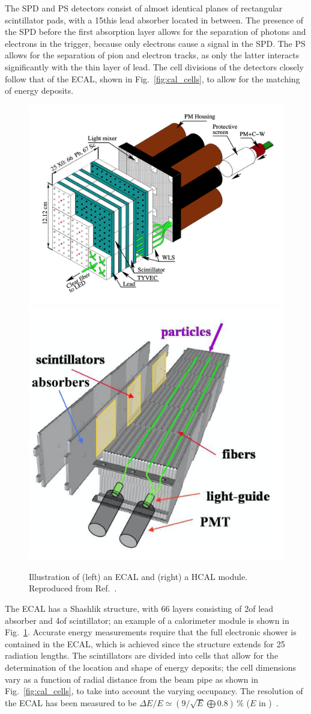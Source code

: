 The SPD and PS detectors consist of almost identical planes of rectangular scintillator pads, with a 15\mm this lead absorber located in between. The presence of the SPD before the first absorption layer allows for the separation of photons and electrons in the trigger, because only electrons cause a signal in the SPD. The PS allows for the separation of pion and electron tracks, as only the latter interacts significantly with the thin layer of lead. The cell divisions of the detectors closely follow that of the ECAL, shown in Fig.~\ref{fig:cal_cells}, to allow for the matching of energy deposits.

\begin{figure}[tb]
    \centering
    \includegraphics[width=0.55\columnwidth]{figures/detector/ECAL_module.png}
    \includegraphics[width=0.40\columnwidth]{figures/detector/HCAL_module.png}
    \caption{Illustration of (left) an ECAL and (right) a HCAL module. Reproduced from Ref.~\cite{ECALpaper,LHCb-Performance}.}
    \label{fig:ECAL_HCAL_modules}
\end{figure}

The ECAL has a Shashlik structure, with 66 layers consisting of 2\mm of lead absorber and 4\mm of scintillator; an example of a calorimeter module is shown in Fig.~\ref{fig:ECAL_HCAL_modules}. Accurate energy measurements require that the full electronic shower is contained in the ECAL, which is achieved since the structure extends for 25 radiation lengths. The scintillators are divided into cells that allow for the determination of the location and shape of energy deposits; the cell dimensions vary as a function of radial distance from the beam pipe as shown in Fig.~\ref{fig:cal_cells}, to take into account the varying occupancy. The resolution of the ECAL has been measured to be $\Delta E/E \simeq (9/\sqrt{E} \bigoplus 0.8)\,\%$ ($E$ in \gevcc)~\cite{LHCb-detector}.

